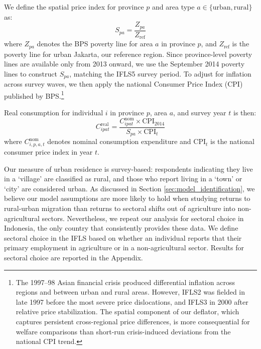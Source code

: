 \documentclass[12pt]{article}
\begin{document}
We define the spatial price index for province $p$ and area type $a \in \{\text{urban}, \text{rural}\}$ as:
\begin{equation}
    S_{pa} = \frac{Z_{pa}}{Z_{\text{ref}}}
\end{equation}
where $Z_{pa}$ denotes the BPS poverty line for area $a$ in province $p$, and $Z_{\text{ref}}$ is the poverty line for urban Jakarta, our reference region.
Since province-level poverty lines are available only from 2013 onward, we use the September 2014 poverty lines to construct $S_{pa}$, matching the IFLS5 survey period. To adjust for inflation across survey waves, we then apply the national Consumer Price Index (CPI) published by BPS.\footnote{The 1997--98 Asian financial crisis produced differential inflation across regions and between urban and rural areas. However, IFLS2 was fielded in late 1997 before the most severe price dislocations, and IFLS3 in 2000 after relative price stabilization. The spatial component of our deflator, which captures persistent cross-regional price differences, is more consequential for welfare comparisons than short-run crisis-induced deviations from the national CPI trend.}

Real consumption for individual $i$ in province $p$, area $a$, and survey year $t$ is then:
\begin{equation}
    C^{\text{real}}_{ipat} = \frac{C^{\text{nom}}_{ipat} \times \text{CPI}_{2014}}{S_{pa} \times \text{CPI}_t}
\end{equation}
where $C^{\text{nom}}_{i,p,a,t}$ denotes nominal consumption expenditure and $\text{CPI}_t$ is the national consumer price index in year $t$.

Our measure of urban residence is survey-based: respondents indicating they live in a `village' are classified as rural, and those who report living in a `town' or `city' are considered urban. As discussed in Section \ref{sec:model_identification}, we believe our model assumptions are more likely to hold when studying returns to rural-urban migration than returns to sectoral shifts out of agriculture into non-agricultural sectors. Nevertheless, we repeat our analysis for sectoral choice in Indonesia, the only country that consistently provides these data. 
We define sectoral choice in the IFLS based on whether an individual reports that their primary employment in agriculture or in a non-agricultural sector.
Results for sectoral choice are reported in the Appendix.



\end{document}
